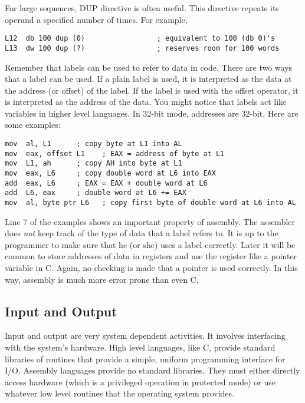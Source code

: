 For large sequences,  {\code DUP} 
directive is often useful. This directive repeats its operand a
specified number of times. For example,
\begin{lstlisting}[language={[x86masm]Assembler}]
L12  db 100 dup (0)                 ; equivalent to 100 (db 0)'s
L13  dw 100 dup (?)                 ; reserves room for 100 words
\end{lstlisting}

Remember that labels can be used to refer to data in code. There are
two ways that a label can be used. If a plain label is used, it is
interpreted as the data at the address (or offset) of the label. If the label is
used with the offset operator, it is interpreted as the address of the data.  You might notice that labels act like variables in higher level languages.
In 32-bit mode, addresses are 32-bit. Here are some examples:
\begin{lstlisting}[language={[x86masm]Assembler}]
mov  al, L1      ; copy byte at L1 into AL
mov  eax, offset L1    ; EAX = address of byte at L1
mov  L1, ah      ; copy AH into byte at L1
mov  eax, L6     ; copy double word at L6 into EAX
add  eax, L6     ; EAX = EAX + double word at L6
add  L6, eax     ; double word at L6 += EAX
mov  al, byte ptr L6   ; copy first byte of double word at L6 into AL
\end{lstlisting}
Line 7 of the examples shows an important property of assembly. The assembler does
\emph{not} keep track of the type of data that a label refers to. It is up
to the programmer to make sure that he (or she) uses a label correctly. Later
it will be common to store addresses of data in registers and use the register
like a pointer variable in C. Again, no checking is made that a pointer is
used correctly. In this way, assembly is much more error prone than even C.

\subsection{Input and Output }

Input and output are very system dependent activities. It involves
interfacing with the system's hardware. High level languages, like C,
provide standard libraries of routines that provide a simple, uniform
programming interface for I/O.  Assembly languages provide no standard
libraries. They must either directly access hardware (which is a privileged
operation in protected mode) or use whatever low level routines that the
operating system provides.


